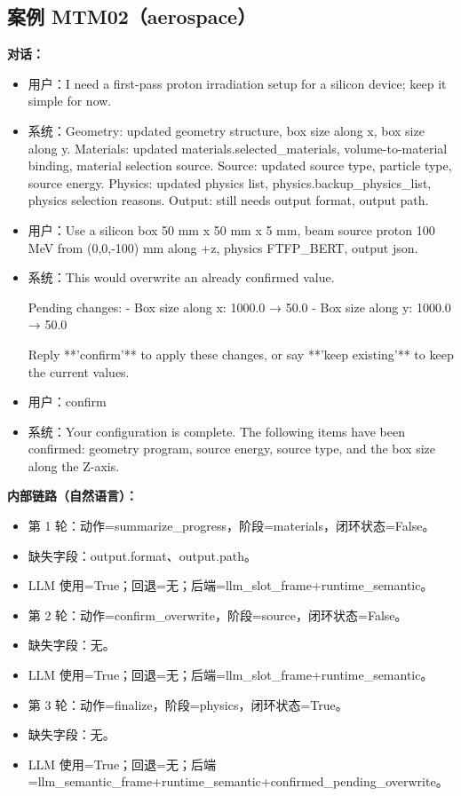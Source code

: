 \documentclass[11pt]{ctexart}
\begin{document}
\subsection{案例 MTM02（aerospace）}
\textbf{对话：}
\begin{itemize}
\item 用户：I need a first-pass proton irradiation setup for a silicon device; keep it simple for now.
\item 系统：Geometry: updated geometry structure, box size along x, box size along y. Materials: updated materials.selected\_materials, volume-to-material binding, material selection source. Source: updated source type, particle type, source energy. Physics: updated physics list, physics.backup\_physics\_list, physics selection reasons. Output: still needs output format, output path.
\item 用户：Use a silicon box 50 mm x 50 mm x 5 mm, beam source proton 100 MeV from (0,0,-100) mm along +z, physics FTFP\_BERT, output json.
\item 系统：This would overwrite an already confirmed value.

Pending changes:
- Box size along x: 1000.0 → 50.0
- Box size along y: 1000.0 → 50.0

Reply **'confirm'** to apply these changes, or say **'keep existing'** to keep the current values.
\item 用户：confirm
\item 系统：Your configuration is complete. The following items have been confirmed: geometry program, source energy, source type, and the box size along the Z-axis.
\end{itemize}
\textbf{内部链路（自然语言）：}
\begin{itemize}
\item 第 1 轮：动作=summarize\_progress，阶段=materials，闭环状态=False。
\item 缺失字段：output.format、output.path。
\item LLM 使用=True；回退=无；后端=llm\_slot\_frame+runtime\_semantic。
\item 第 2 轮：动作=confirm\_overwrite，阶段=source，闭环状态=False。
\item 缺失字段：无。
\item LLM 使用=True；回退=无；后端=llm\_slot\_frame+runtime\_semantic。
\item 第 3 轮：动作=finalize，阶段=physics，闭环状态=True。
\item 缺失字段：无。
\item LLM 使用=True；回退=无；后端=llm\_semantic\_frame+runtime\_semantic+confirmed\_pending\_overwrite。
\end{itemize}
\end{document}
